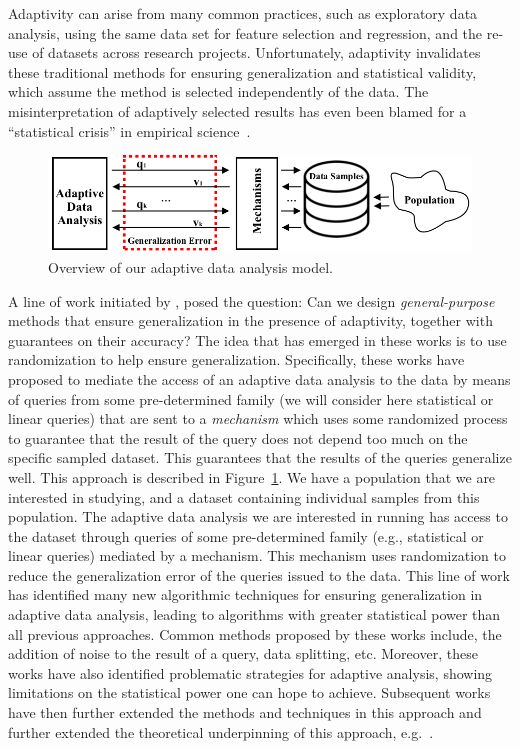  Adaptivity can arise from many common practices, such as exploratory data analysis, using the same data set for feature selection and regression, and the re-use of datasets across research projects. Unfortunately, adaptivity invalidates these traditional methods for ensuring generalization and statistical validity, which assume the method is selected independently of the data. The misinterpretation of adaptively selected results has even been blamed for a ``statistical crisis'' in empirical science~\cite{GelmanL13}.

\begin{figure}
    \centering
    \includegraphics[width=0.9\columnwidth]{chapters/adapt/overview-dissertation.png}
    \caption{Overview of our adaptive data analysis model. }
    \label{fig:adaptivity-model-overview}
\vspace{-0.5cm}
\end{figure}

A line of work initiated by \citet{DworkFHPRR15}, \citet{HardtU14} posed the question: Can we design \emph{general-purpose} methods that ensure generalization in the presence of adaptivity, together with guarantees on their accuracy?  The idea that has emerged in these works is to use randomization to help ensure generalization. Specifically, these works have proposed to mediate the access of an adaptive data analysis to the data by means of queries from some pre-determined family (we will consider here statistical or linear queries) that are sent to a  \emph{mechanism} which uses some randomized process to guarantee that the result of the query does not depend too much on the specific
sampled dataset. This guarantees that the results of the queries generalize well. This approach is described in Figure~\ref{fig:adaptivity-model-overview}.  We have a population that we are interested in studying, and a dataset containing individual samples from this population. The adaptive data analysis we are interested in running has access to the dataset through queries of some pre-determined family (e.g., statistical or linear queries) mediated by a mechanism. This mechanism uses randomization to reduce the generalization error of the queries issued to the data.
This line of work has identified many new algorithmic techniques for ensuring generalization in adaptive data analysis, leading to algorithms with greater statistical power than all previous approaches. Common methods proposed by these works include, the addition of noise to the result of a query, data splitting, etc. Moreover, these works have also identified problematic strategies for adaptive analysis, showing limitations on the statistical power one can hope to achieve. Subsequent works have then further extended the methods and techniques in this approach and further extended the theoretical underpinning of this approach, e.g.~\cite{dwork2015reusable,dwork2015generalization,BassilyNSSSU16,UllmanSNSS18,FeldmanS17,jung2019new,SteinkeZ20,RogersRSSTW20}.
%

